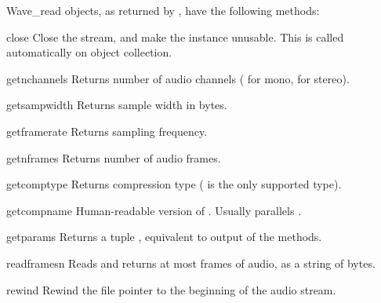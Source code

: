Wave_read objects, as returned by , have the
following methods:

\begin{methoddesc}{close}{}
Close the stream, and make the instance unusable. This is
called automatically on object collection.
\end{methoddesc}

\begin{methoddesc}{getnchannels}{}
Returns number of audio channels ( for mono,  for
stereo).
\end{methoddesc}

\begin{methoddesc}{getsampwidth}{}
Returns sample width in bytes.
\end{methoddesc}

\begin{methoddesc}{getframerate}{}
Returns sampling frequency.
\end{methoddesc}

\begin{methoddesc}{getnframes}{}
Returns number of audio frames.
\end{methoddesc}

\begin{methoddesc}{getcomptype}{}
Returns compression type ( is the only supported type).
\end{methoddesc}

\begin{methoddesc}{getcompname}{}
Human-readable version of .
Usually  parallels .
\end{methoddesc}

\begin{methoddesc}{getparams}{}
Returns a tuple
, equivalent to output
of the  methods.
\end{methoddesc}

\begin{methoddesc}{readframes}{n}
Reads and returns at most  frames of audio, as a string of bytes.
\end{methoddesc}

\begin{methoddesc}{rewind}{}
Rewind the file pointer to the beginning of the audio stream.
\end{methoddesc}

